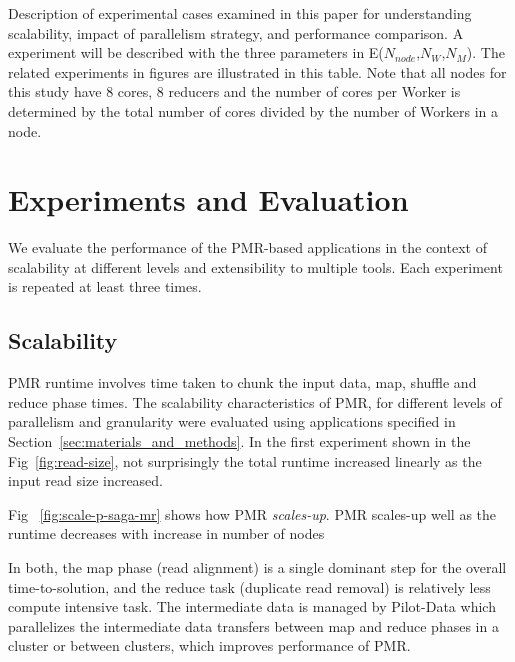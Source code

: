 \documentclass{acm_proc_article-sp}
\begin{document}
\begin{center}
\begin{table}[ht]
 \caption{Description of experimental cases examined in this paper for understanding scalability, impact of parallelism strategy, and performance comparison.  A experiment will be described with the three parameters in E($N_{node}$,$N_W$,$N_M$).  The related experiments in figures are illustrated in this table.  Note that all nodes for this study have 8 cores, 8 reducers and the number of cores per Worker is determined by the total number of cores divided by the number of Workers in a node.}
    \label{table:exp-description} 
\end{table}
\end{center}

\section{Experiments and Evaluation}\label{sec:results}

We evaluate the performance of the PMR-based applications in the
context of scalability at different levels and extensibility to
multiple tools.  Each experiment is repeated at least three times.

\subsection{Scalability}

PMR runtime involves time taken to chunk the input data, map, shuffle
and reduce phase times.  The scalability characteristics of PMR, for
different levels of parallelism and granularity were evaluated using
applications specified in Section~\ref{sec:materials_and_methods}.  In
the first experiment shown in the Fig~\ref{fig:read-size}, not
surprisingly the total runtime increased linearly as the input read
size increased.


Fig ~\ref{fig:scale-p-saga-mr} shows how PMR \textit{scales-up}. PMR
scales-up well as the runtime decreases with increase in number of
nodes 

In both, the map phase (read alignment) is a single dominant step for
the overall time-to-solution, and the reduce task (duplicate read
removal) is relatively less compute intensive task. The intermediate
data is managed by Pilot-Data which parallelizes the intermediate data
transfers between map and reduce phases in a cluster or between
clusters, which improves performance of PMR.
\end{document}
